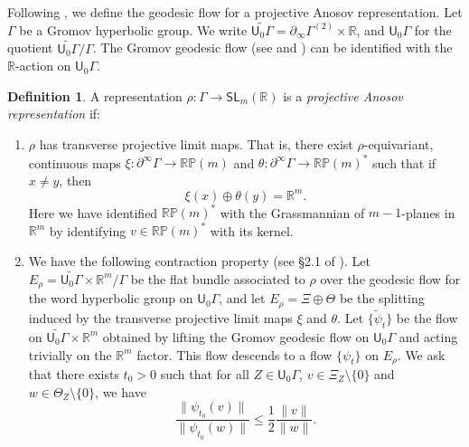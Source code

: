\documentclass[JEP,XML,SOM,Unicode,NoFloatCountersInSection]{cedram}
\theoremstyle{definition}
\newtheorem{defn}[thm]{Definition}
\numberwithin{equation}{section}
\begin{document}
Following \cite{bcls}, we define the geodesic flow for a projective Anosov representation. Let $\Gamma$ be a Gromov hyperbolic group. We write $\widetilde{\mathsf{U}_0\Gamma} = \partial_\infty \Gamma^{(2)} \times \mathbb R$, and $\mathsf{U}_0\Gamma$ for the quotient $\widetilde{\mathsf{U}_0\Gamma}/\Gamma$. The Gromov geodesic flow (see \cite{champetier} and \cite{mineyev}) can be identified with the $\mathbb R$-action on $\mathsf{U}_0\Gamma$.
\begin{defn}
A representation $\rho:\Gamma\to\mathsf{SL}_m(\mathbb{R})$ is a \emph{projective Anosov representation} if:
\begin{enumerate}
\item $\rho$ has transverse projective limit maps. That is, there exist $\rho$-equivariant, continuous maps $\xi:\partial^\infty\Gamma \to \mathbb{RP}(m)$ and $\theta:\partial^\infty\Gamma \to \mathbb{RP}(m)^*$ such that if $x\neq y$, then
\[ \xi(x) \oplus \theta(y) = \mathbb{R}^m.\]
Here we have identified $\mathbb{RP}(m)^*$ with the Grassmannian of $m-1$-planes in $\mathbb{R}^m$ by identifying $v\in\mathbb{RP}(m)^*$ with its kernel.

\item We have the following contraction property (see \S2.1 of \cite{bcls}). Let $E_\rho = \widetilde{\mathsf{U}_0\Gamma} \times \mathbb R^{m}/ \Gamma$ be the flat bundle associated to $\rho$ over the geodesic flow for the word hyperbolic group on $\mathsf{U}_0\Gamma$, and let $E_\rho = \Xi \oplus \Theta$ be the splitting induced by the transverse projective limit maps $\xi$ and $\theta$. Let $\{\tilde \psi_t\}$ be the flow on $\widetilde{\mathsf{U}_0\Gamma} \times \mathbb R^{m}$ obtained by lifting the Gromov geodesic flow on $\mathsf{U}_0\Gamma$ and acting trivially on the $\mathbb R^m$ factor. This flow descends to a flow $\{\psi_t\}$ on $E_\rho$. We ask that there exists $t_0>0$ such that for all $Z\in \mathsf{U}_0\Gamma$, $v \in \Xi_Z\setminus\{0\}$ and $w \in \Theta_Z \setminus \{ 0\}$, we have
\[ \frac{\| \psi_{t_0} (v) \|}{\| \psi_{t_0} (w) \|} \leq \frac{1}{2} \frac{ \| v \|}{\| w \|}. \] 
\end{enumerate}
\end{defn}
\end{document}
